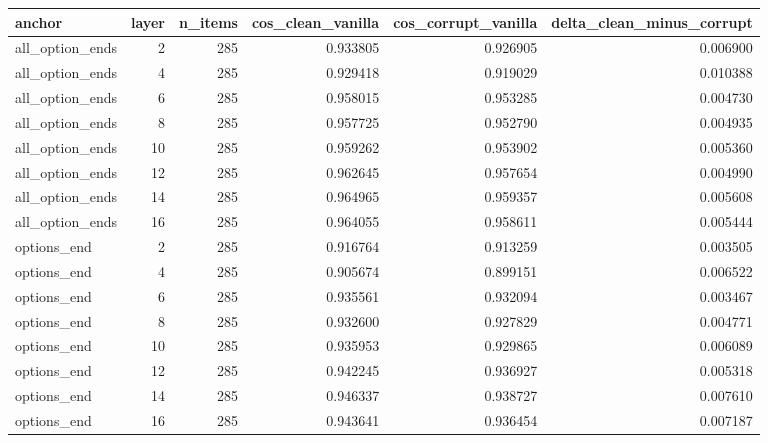 \begin{tabular}{lrrrrr}
\toprule
anchor & layer & n\_items & cos\_clean\_vanilla & cos\_corrupt\_vanilla & delta\_clean\_minus\_corrupt \\
\midrule
all\_option\_ends & 2 & 285 & 0.933805 & 0.926905 & 0.006900 \\
all\_option\_ends & 4 & 285 & 0.929418 & 0.919029 & 0.010388 \\
all\_option\_ends & 6 & 285 & 0.958015 & 0.953285 & 0.004730 \\
all\_option\_ends & 8 & 285 & 0.957725 & 0.952790 & 0.004935 \\
all\_option\_ends & 10 & 285 & 0.959262 & 0.953902 & 0.005360 \\
all\_option\_ends & 12 & 285 & 0.962645 & 0.957654 & 0.004990 \\
all\_option\_ends & 14 & 285 & 0.964965 & 0.959357 & 0.005608 \\
all\_option\_ends & 16 & 285 & 0.964055 & 0.958611 & 0.005444 \\
options\_end & 2 & 285 & 0.916764 & 0.913259 & 0.003505 \\
options\_end & 4 & 285 & 0.905674 & 0.899151 & 0.006522 \\
options\_end & 6 & 285 & 0.935561 & 0.932094 & 0.003467 \\
options\_end & 8 & 285 & 0.932600 & 0.927829 & 0.004771 \\
options\_end & 10 & 285 & 0.935953 & 0.929865 & 0.006089 \\
options\_end & 12 & 285 & 0.942245 & 0.936927 & 0.005318 \\
options\_end & 14 & 285 & 0.946337 & 0.938727 & 0.007610 \\
options\_end & 16 & 285 & 0.943641 & 0.936454 & 0.007187 \\
\bottomrule
\end{tabular}
